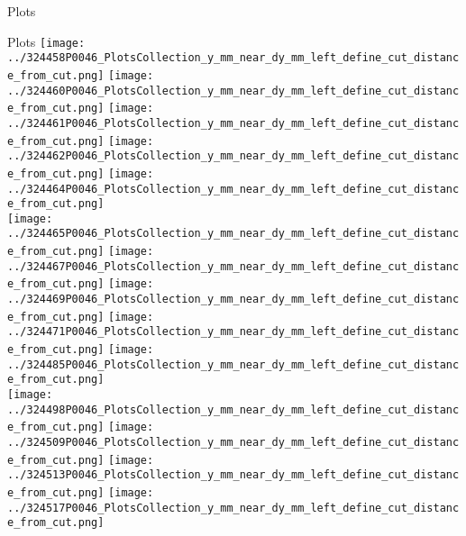 \documentclass{beamer}
\begin{document}
\begin{frame}
\begin{block}{Plots}
        \end{block}
\end{frame}
\begin{frame}\tiny
        \begin{block}{Plots}
		  \centering
                \texttt{[image: ../324458P0046\_PlotsCollection\_y\_mm\_near\_dy\_mm\_left\_define\_cut\_distance\_from\_cut.png]}
                \texttt{[image: ../324460P0046\_PlotsCollection\_y\_mm\_near\_dy\_mm\_left\_define\_cut\_distance\_from\_cut.png]}
                \texttt{[image: ../324461P0046\_PlotsCollection\_y\_mm\_near\_dy\_mm\_left\_define\_cut\_distance\_from\_cut.png]}
                \texttt{[image: ../324462P0046\_PlotsCollection\_y\_mm\_near\_dy\_mm\_left\_define\_cut\_distance\_from\_cut.png]}
                \texttt{[image: ../324464P0046\_PlotsCollection\_y\_mm\_near\_dy\_mm\_left\_define\_cut\_distance\_from\_cut.png]}\\
                \texttt{[image: ../324465P0046\_PlotsCollection\_y\_mm\_near\_dy\_mm\_left\_define\_cut\_distance\_from\_cut.png]}
                \texttt{[image: ../324467P0046\_PlotsCollection\_y\_mm\_near\_dy\_mm\_left\_define\_cut\_distance\_from\_cut.png]}
                \texttt{[image: ../324469P0046\_PlotsCollection\_y\_mm\_near\_dy\_mm\_left\_define\_cut\_distance\_from\_cut.png]}
                \texttt{[image: ../324471P0046\_PlotsCollection\_y\_mm\_near\_dy\_mm\_left\_define\_cut\_distance\_from\_cut.png]}
                \texttt{[image: ../324485P0046\_PlotsCollection\_y\_mm\_near\_dy\_mm\_left\_define\_cut\_distance\_from\_cut.png]}\\
                \texttt{[image: ../324498P0046\_PlotsCollection\_y\_mm\_near\_dy\_mm\_left\_define\_cut\_distance\_from\_cut.png]}
                \texttt{[image: ../324509P0046\_PlotsCollection\_y\_mm\_near\_dy\_mm\_left\_define\_cut\_distance\_from\_cut.png]}
                \texttt{[image: ../324513P0046\_PlotsCollection\_y\_mm\_near\_dy\_mm\_left\_define\_cut\_distance\_from\_cut.png]}
                \texttt{[image: ../324517P0046\_PlotsCollection\_y\_mm\_near\_dy\_mm\_left\_define\_cut\_distance\_from\_cut.png]}

\end{block}
\end{frame}
\end{document}

